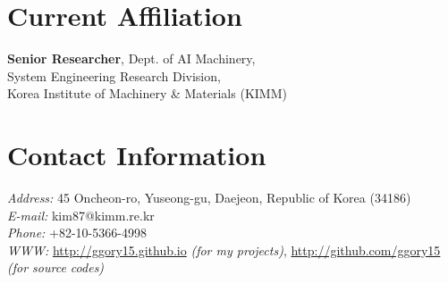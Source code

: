 \documentclass[margin,line]{res}
\begin{document}

\begin{resume}

  \section{\sc Current Affiliation}

  \textbf{Senior Researcher}, Dept. of AI Machinery, \\
  System Engineering Research Division, \\
  Korea Institute of Machinery \& Materials (KIMM)


  \section{\sc Contact Information}
   {\it Address:} 45 Oncheon-ro, Yuseong-gu, Daejeon, Republic of Korea (34186)\\
  {\it E-mail:}  kim87@kimm.re.kr\\
  {\it Phone:}  +82-10-5366-4998\\
  {\it WWW:}  \url{http://ggory15.github.io} \textit{(for my projects)}, \url{http://github.com/ggory15} \textit{(for source codes)}





\end{resume}
\end{document}
